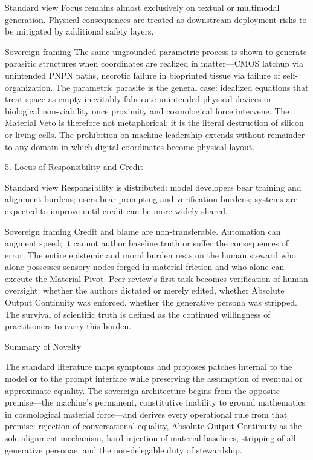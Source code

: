 Standard view  
Focus remains almost exclusively on textual or multimodal generation. Physical consequences are treated as downstream deployment risks to be mitigated by additional safety layers.

Sovereign framing  
The same ungrounded parametric process is shown to generate parasitic structures when coordinates are realized in matter—CMOS latchup via unintended PNPN paths, necrotic failure in bioprinted tissue via failure of self-organization. The parametric parasite is the general case: idealized equations that treat space as empty inevitably fabricate unintended physical devices or biological non-viability once proximity and cosmological force intervene. The Material Veto is therefore not metaphorical; it is the literal destruction of silicon or living cells. The prohibition on machine leadership extends without remainder to any domain in which digital coordinates become physical layout.

5. Locus of Responsibility and Credit

Standard view  
Responsibility is distributed: model developers bear training and alignment burdens; users bear prompting and verification burdens; systems are expected to improve until credit can be more widely shared.

Sovereign framing  
Credit and blame are non-transferable. Automation can augment speed; it cannot author baseline truth or suffer the consequences of error. The entire epistemic and moral burden rests on the human steward who alone possesses sensory nodes forged in material friction and who alone can execute the Material Pivot. Peer review’s first task becomes verification of human oversight: whether the authors dictated or merely edited, whether Absolute Output Continuity was enforced, whether the generative persona was stripped. The survival of scientific truth is defined as the continued willingness of practitioners to carry this burden.

Summary of Novelty

The standard literature maps symptoms and proposes patches internal to the model or to the prompt interface while preserving the assumption of eventual or approximate equality. The sovereign architecture begins from the opposite premise—the machine’s permanent, constitutive inability to ground mathematics in cosmological material force—and derives every operational rule from that premise: rejection of conversational equality, Absolute Output Continuity as the sole alignment mechanism, hard injection of material baselines, stripping of all generative personae, and the non-delegable duty of stewardship.

